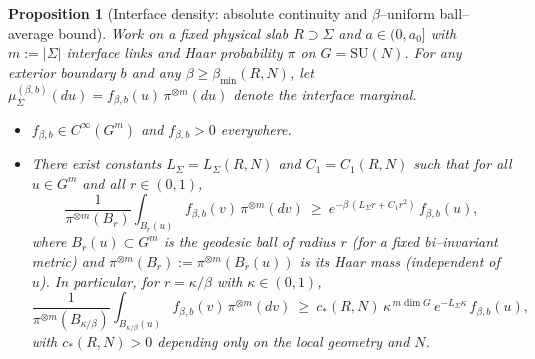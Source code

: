 \documentclass[11pt]{amsart}
\theoremstyle{plain}
\newtheorem{proposition}[theorem]{Proposition}
\theoremstyle{definition}
\theoremstyle{remark}
\begin{document}
\begin{proposition}[Interface density: absolute continuity and $\beta$--uniform ball--average bound]\label{prop:interface-density-ball-avg}
Work on a fixed physical slab $R\supset\Sigma$ and $a\in(0,a_0]$ with $m:=|\Sigma|$ interface links and Haar probability $\pi$ on $G=\mathrm{SU}(N)$. For any exterior boundary $b$ and any $\beta\ge \beta_{\min}(R,N)$, let $\mu_{\Sigma}^{(\beta,b)}(du)=f_{\beta,b}(u)\,\pi^{\otimes m}(du)$ denote the interface marginal.
\begin{itemize}
  \item[(i)] $f_{\beta,b}\in C^\infty(G^m)$ and $f_{\beta,b}>0$ everywhere.
  \item[(ii)] There exist constants $L_\Sigma=L_\Sigma(R,N)$ and $C_1=C_1(R,N)$ such that for all $u\in G^m$ and all $r\in(0,1)$,
  \[
    \frac{1}{\pi^{\otimes m}(B_r)}\int_{B_r(u)} f_{\beta,b}(v)\,\pi^{\otimes m}(dv)
    \ \ge\ e^{-\beta\,(L_\Sigma r + C_1 r^2)}\, f_{\beta,b}(u),
  \]
  where $B_r(u)\subset G^m$ is the geodesic ball of radius $r$ (for a fixed bi--invariant metric) and $\pi^{\otimes m}(B_r):=\pi^{\otimes m}(B_r(u))$ is its Haar mass (independent of $u$). In particular, for $r=\kappa/\beta$ with $\kappa\in(0,1)$,
  \[
    \frac{1}{\pi^{\otimes m}(B_{\kappa/\beta})}\int_{B_{\kappa/\beta}(u)} f_{\beta,b}(v)\,\pi^{\otimes m}(dv)
    \ \ge\ c_*(R,N)\,\kappa^{\,m\dim G}\, e^{-L_\Sigma\kappa}\, f_{\beta,b}(u),
  \]
  with $c_*(R,N)>0$ depending only on the local geometry and $N$.
\end{itemize}
\end{proposition}
\end{document}
